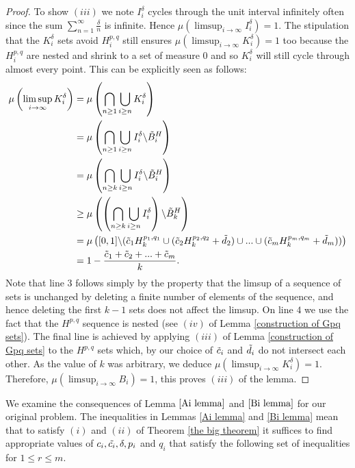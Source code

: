 \documentclass[12pt]{article}
\begin{document}
\begin{proof}
To show $(iii)$ we note $I_i^{\delta}$ cycles through the unit interval infinitely often since the sum $\sum_{n=1}^\infty \frac{\delta}{n}$ is infinite. Hence $\mu(\limsup_{i \rightarrow \infty}I_i^\delta) =1$. The stipulation that the $K_i^\delta$ sets avoid $H_i^{p,q}$ still ensures $\mu(\limsup_{i\rightarrow \infty} K_i^\delta)=1$ too because the $H_i^{p,q}$ are nested and shrink to a set of measure 0 and so $K_i^\delta$ will still cycle through almost every point. This can be explicitly seen as follows:
\begin{align*}
    \mu\left( \limsup_{i \rightarrow \infty} K_i^\delta \right)&=\mu\left( \bigcap_{n \geq 1}\bigcup_{i \geq n} K_i^\delta\right) \\ &=     \mu\left( \bigcap_{n \geq 1}\bigcup_{i \geq n} I_i^\delta \backslash \Tilde{B}_i^H \right)\\ &=  \mu\left( \bigcap_{n \geq k}\bigcup_{i \geq n} I_i^\delta \backslash \Tilde{B}_i^H \right)\\ &\geq
    \mu\left( \left(\bigcap_{n \geq k}\bigcup_{i \geq n} I_i^\delta\right) \backslash \Tilde{B}_k^H\right) \\
    &=\mu \left([0,1]\backslash(\Tilde{c}_1 H_{k}^{p_1,q_1} \cup ( \Tilde{c}_2 H_{k}^{p_2,q_2}+ \Tilde{d}_2 ) \cup ... \cup (\Tilde{c}_m H_{k}^{p_m,q_m}+\Tilde{d}_m )) \right) \\
    &=1-\frac{\Tilde{c}_1+\Tilde{c}_2+...+\Tilde{c}_m}{k}.
\end{align*}
Note that line $3$ follows simply by the property that the limsup of a sequence of sets is unchanged by deleting a finite number of elements of the sequence, and hence deleting the first $k-1$ sets does not affect the limsup. On line $4$ we use the fact that the $H^{p,q}$ sequence is nested (see $(iv)$ of Lemma \ref{construction of Gpq sets}). The final line is achieved by applying $(iii)$ of Lemma \ref{construction of Gpq sets} to the $H^{p,q}$ sets which, by our choice of $\Tilde{c}_i$ and $\Tilde{d}_i$ do not intersect each other. As the value of $k$ was arbitrary, we deduce $\mu(\limsup_{i \rightarrow \infty }K_i^\delta)=1$. Therefore, $\mu(\limsup_{i \rightarrow \infty }B_i)=1$, this proves $(iii)$ of the lemma.
\end{proof}
We examine the consequences of Lemma $\ref{Ai lemma}$ and $\ref{Bi lemma}$ for our original problem. The inequalities in Lemmas \ref{Ai lemma} and \ref{Bi lemma} mean that to satisfy $(i)$ and $(ii)$ of Theorem \ref{the big theorem} it suffices to find appropriate values of $c_i, \Tilde{c_i}, \delta, p_i$ and $q_i$ that satisfy the following set of inequalities for $1 \leq r \leq m$.
\end{document}
